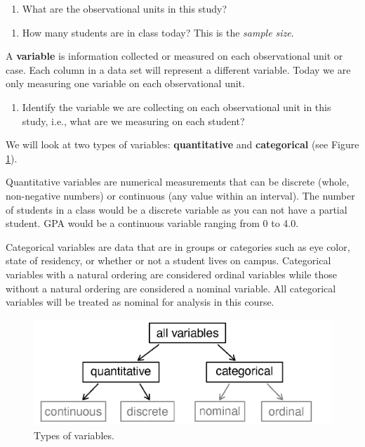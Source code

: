 \documentclass[
]{report}
\providecommand{\tightlist}{%
  \setlength{\itemsep}{0pt}\setlength{\parskip}{0pt}}
\begin{document}
\begin{enumerate}
\def\labelenumi{\arabic{enumi}.}
\tightlist
\item
  What are the observational units in this study?
\end{enumerate}

\vspace{0.4in}

\begin{enumerate}
\def\labelenumi{\arabic{enumi}.}
\setcounter{enumi}{1}
\tightlist
\item
  How many students are in class today? This is the \emph{sample size}.
\end{enumerate}

\vspace{0.3in}

A \textbf{variable} is information collected or measured on each observational unit or case. Each column in a data set will represent a different variable. Today we are only measuring one variable on each observational unit.

\begin{enumerate}
\def\labelenumi{\arabic{enumi}.}
\setcounter{enumi}{2}
\tightlist
\item
  Identify the variable we are collecting on each observational unit in this study, i.e., what are we measuring on each student?
\end{enumerate}

\vspace{.8in}

We will look at two types of variables: \textbf{quantitative} and \textbf{categorical} (see Figure \ref{fig:types-of-variables}).

Quantitative variables are numerical measurements that can be discrete (whole, non-negative numbers) or continuous (any value within an interval). The number of students in a class would be a discrete variable as you can not have a partial student. GPA would be a continuous variable ranging from 0 to 4.0.

Categorical variables are data that are in groups or categories such as eye color, state of residency, or whether or not a student lives on campus. Categorical variables with a natural ordering are considered ordinal variables while those without a natural ordering are considered a nominal variable. All categorical variables will be treated as nominal for analysis in this course.

\begin{figure}

{\centering \includegraphics[width=0.6\linewidth]{images/variables} 

}

\caption{Types of variables.}\label{fig:types-of-variables}
\end{figure}
\end{document}
